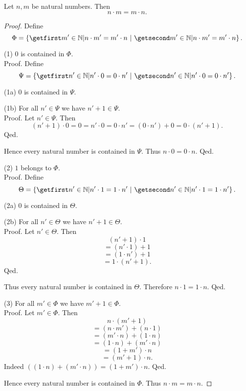 \documentclass[../arithmetic.tex]{subfiles}
\begin{document}
  \begin{forthel}
    \begin{proposition}
      Let $n, m$ be natural numbers.
      Then \[ n \cdot m = m \cdot n. \]
    \end{proposition}
    \begin{proof}
      Define \[ \Phi = \class{m' \in \Nat | n \cdot m' = m' \cdot n}. \]

      (1) $0$ is contained in $\Phi$. \\
      Proof.
        Define \[ \Psi = \class{n' \in \Nat | n' \cdot 0 = 0 \cdot n'}. \]

        (1a) $0$ is contained in $\Psi$.

        (1b) For all $n' \in \Psi$ we have $n' + 1 \in \Psi$. \\
        Proof.
          Let $n' \in \Psi$.
          Then
          \[ (n' + 1) \cdot 0
            = 0
            = n' \cdot 0
            = 0 \cdot n'
            = (0 \cdot n') + 0
            = 0 \cdot (n' + 1). \]
        Qed.

        Hence every natural number is contained in $\Psi$.
        Thus $n \cdot 0 = 0 \cdot n$.
      Qed.

      (2) $1$ belongs to $\Phi$. \\
      Proof.
        Define \[ \Theta = \class{n' \in \Nat | n' \cdot 1 = 1 \cdot n'}. \]

        (2a) $0$ is contained in $\Theta$.

        (2b) For all $n' \in \Theta$ we have $n' + 1 \in \Theta$. \\
        Proof.
          Let $n' \in \Theta$.
          Then
          \[  (n' + 1) \cdot 1        \]
          \[    = (n' \cdot 1) + 1    \]
          \[    = (1 \cdot n') + 1    \]
          \[    = 1 \cdot (n' + 1).   \]
        Qed.

        Thus every natural number is contained in $\Theta$.
        Therefore $n \cdot 1 = 1 \cdot n$.
      Qed.

      (3) For all $m' \in \Phi$ we have $m' + 1 \in \Phi$. \\
      Proof.
        Let $m' \in \Phi$.
        Then
        \[  n \cdot (m' + 1)                \]
        \[    = (n \cdot m') + (n \cdot 1)  \]
        \[    = (m' \cdot n) + (1 \cdot n)  \]
        \[    = (1 \cdot n) + (m' \cdot n)  \]
        \[    = (1 + m') \cdot n            \]
        \[    = (m' + 1) \cdot n.           \]
        Indeed $((1 \cdot n) + (m' \cdot n)) = (1 + m') \cdot n$. %
      Qed.

      Hence every natural number is contained in $\Phi$.
      Thus $n \cdot m = m \cdot n$.
    \end{proof}
  \end{forthel}
\end{document}
